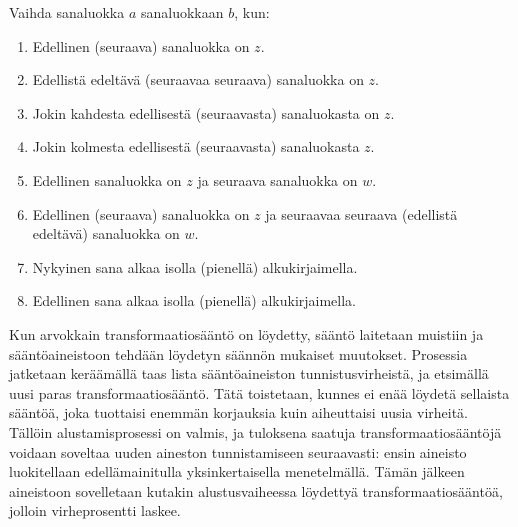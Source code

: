 \documentclass[utf8,bachelor,manualbib]{gradu3}
\begin{document}
Vaihda sanaluokka $a$ sanaluokkaan $b$, kun:

\begin{enumerate}
\item Edellinen (seuraava) sanaluokka on $z$.
\item Edellistä edeltävä (seuraavaa seuraava) sanaluokka on $z$. 
\item Jokin kahdesta edellisestä (seuraavasta) sanaluokasta on $z$.
\item Jokin kolmesta edellisestä (seuraavasta) sanaluokasta $z$.
\item Edellinen sanaluokka on $z$ ja seuraava sanaluokka on $w$.
\item Edellinen (seuraava) sanaluokka on $z$ ja seuraavaa seuraava (edellistä edeltävä) sanaluokka on $w$. 
\item Nykyinen sana alkaa isolla (pienellä) alkukirjaimella.
\item Edellinen sana alkaa isolla (pienellä) alkukirjaimella.
\end{enumerate}

Kun arvokkain transformaatiosääntö on löydetty, sääntö laitetaan muistiin ja sääntöaineistoon tehdään löydetyn säännön mukaiset muutokset. Prosessia jatketaan keräämällä taas lista sääntöaineiston tunnistusvirheistä, ja etsimällä uusi paras transformaatiosääntö. Tätä toistetaan, kunnes ei enää löydetä sellaista sääntöä, joka tuottaisi enemmän korjauksia kuin aiheuttaisi uusia virheitä. Tällöin alustamisprosessi on valmis, ja tuloksena saatuja transformaatiosääntöjä voidaan soveltaa uuden aineston tunnistamiseen seuraavasti: ensin aineisto luokitellaan edellämainitulla yksinkertaisella menetelmällä. Tämän jälkeen aineistoon sovelletaan kutakin alustusvaiheessa löydettyä transformaatiosääntöä, jolloin virheprosentti laskee. \citep{brill1992}
\end{document}
